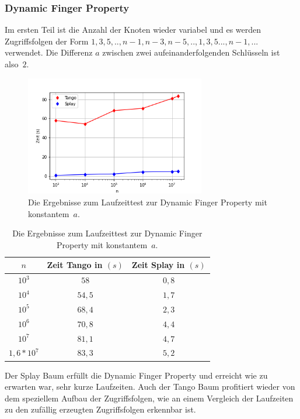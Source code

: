 \documentclass[a4paper,12pt]{article}
\begin{document}
\subsubsection{Dynamic Finger Property}
Im ersten Teil ist die Anzahl der Knoten wieder variabel und es werden Zugriffsfolgen der Form  $1, 3, 5,..,n-1, n-3, n-5, ..,1, 3, 5..., n-1,...$ verwendet. Die Differenz $a$ zwischen zwei aufeinanderfolgenden Schlüsseln ist \mbox{also $2$}.
\begin{figure}[H]
	\centering
	\includegraphics[width=0.7\textwidth]{Medien/laufzeittest/diagramm/dynamicfinger}
	\caption{Die Ergebnisse zum Laufzeittest zur Dynamic Finger Property mit \mbox{konstantem $a$.}}
\end{figure}
\begin{table}[H]
	\begin{center}
		\begin{tabular}[c]{|c|c|c|}
			\hline
			$n$ & Zeit Tango in $\left(s\right)$ &Zeit Splay in $\left(s\right)$ \\
			\hline
			$10^3$ & $58$ &$0,8$ \\
			\hline
			$10^4$  & $54,5$ &$1,7$  \\
			\hline
			$10^5$  & $68,4$ &$2,3$  \\
			\hline
			$10^6$  & $70,8$ &$4,4$  \\
			\hline
			$10^7$  & $81,1$ &$4,7$  \\
			\hline
			$1,6 *10^7$  & $83,3$ &$5,2$  \\
			\hline
		\end{tabular}
		\caption{Die Ergebnisse zum Laufzeittest zur Dynamic Finger Property mit \mbox{konstantem $a$.}} 
	\end{center}
\end{table}
\noindent Der Splay Baum erfüllt die Dynamic Finger Property und erreicht wie zu erwarten war, sehr kurze Laufzeiten. Auch der Tango Baum profitiert wieder von dem speziellem Aufbau der Zugriffsfolgen, wie an einem Vergleich der Laufzeiten zu den zufällig erzeugten Zugriffsfolgen erkennbar ist. 
\end{document}
